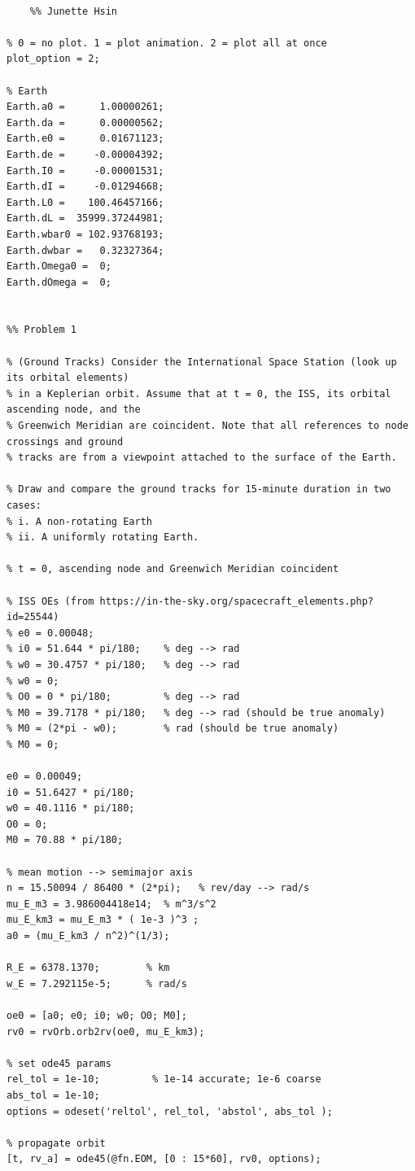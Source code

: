 \documentclass[conf]{new-aiaa}
\begin{document}
\begin{lstlisting}

	%% Junette Hsin 

% 0 = no plot. 1 = plot animation. 2 = plot all at once 
plot_option = 2; 
 
% Earth 
Earth.a0 =      1.00000261; 
Earth.da =      0.00000562; 
Earth.e0 =      0.01671123; 
Earth.de =     -0.00004392; 
Earth.I0 =     -0.00001531; 
Earth.dI =     -0.01294668;
Earth.L0 =    100.46457166; 
Earth.dL =  35999.37244981; 
Earth.wbar0 = 102.93768193; 
Earth.dwbar =   0.32327364;
Earth.Omega0 =  0; 
Earth.dOmega =  0; 


%% Problem 1 

% (Ground Tracks) Consider the International Space Station (look up its orbital elements)
% in a Keplerian orbit. Assume that at t = 0, the ISS, its orbital ascending node, and the
% Greenwich Meridian are coincident. Note that all references to node crossings and ground
% tracks are from a viewpoint attached to the surface of the Earth.

% Draw and compare the ground tracks for 15-minute duration in two cases: 
% i. A non-rotating Earth
% ii. A uniformly rotating Earth.

% t = 0, ascending node and Greenwich Meridian coincident 

% ISS OEs (from https://in-the-sky.org/spacecraft_elements.php?id=25544)  
% e0 = 0.00048;   
% i0 = 51.644 * pi/180;    % deg --> rad
% w0 = 30.4757 * pi/180;   % deg --> rad
% w0 = 0; 
% O0 = 0 * pi/180;         % deg --> rad
% M0 = 39.7178 * pi/180;   % deg --> rad (should be true anomaly) 
% M0 = (2*pi - w0);        % rad (should be true anomaly) 
% M0 = 0; 

e0 = 0.00049; 
i0 = 51.6427 * pi/180; 
w0 = 40.1116 * pi/180; 
O0 = 0; 
M0 = 70.88 * pi/180; 

% mean motion --> semimajor axis 
n = 15.50094 / 86400 * (2*pi);   % rev/day --> rad/s 
mu_E_m3 = 3.986004418e14;  % m^3/s^2
mu_E_km3 = mu_E_m3 * ( 1e-3 )^3 ; 
a0 = (mu_E_km3 / n^2)^(1/3); 

R_E = 6378.1370;        % km 
w_E = 7.292115e-5;      % rad/s 

oe0 = [a0; e0; i0; w0; O0; M0]; 
rv0 = rvOrb.orb2rv(oe0, mu_E_km3); 

% set ode45 params 
rel_tol = 1e-10;         % 1e-14 accurate; 1e-6 coarse 
abs_tol = 1e-10; 
options = odeset('reltol', rel_tol, 'abstol', abs_tol ); 

% propagate orbit 
[t, rv_a] = ode45(@fn.EOM, [0 : 15*60], rv0, options); 



\end{lstlisting}
\end{document}
